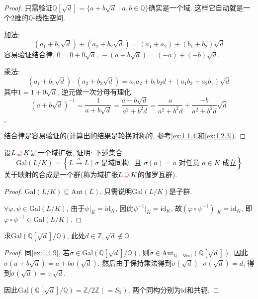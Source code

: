 \begin{proof}
    只需验证$\mathbb{Q}[\sqrt{d}] = \{a + b\sqrt{d} \mid a, b \in \mathbb{Q}\}$确实是一个域. 这样它自动就是一个$2$维的$\mathbb{Q}$-线性空间.
    
    加法:
    \[
        (a_1 + b_1\sqrt{d}) + (a_2 + b_2\sqrt{d}) = (a_1 + a_2) + (b_1 + b_2)\sqrt{d}
    \]
    容易验证结合律, $0 = 0 + 0\sqrt{d},\, -(a + b\sqrt{d}) = (-a) + (-b)\sqrt{d}$.
    
    乘法:
    \[
        (a_1 + b_1\sqrt{d}) \cdot (a_2 + b_2\sqrt{d}) = a_1a_2 + b_1b_2d + (a_1b_2 + a_2b_1)\sqrt{d}
    \]
    其中$1 = 1 + 0\sqrt{d}$, 逆元做一次分母有理化
    \[
        (a + b\sqrt{d})^{-1} = \frac{1}{a + b\sqrt{d}} = \frac{a - b\sqrt{d}}{a^2 + b^2d} = \frac{a}{a^2 + b^2d} + \frac{- b}{a^2 + b^2d}\sqrt{d}
    \],
    
    结合律是容易验证的(计算出的结果是轮换对称的, 参考\ref{ex:1.1.4}和\ref{ex:1.2.3}).
\end{proof}

\begin{problem}
    设$L \,\textcolor{red}{\supseteq}\, K$是一个域扩张, 证明: 下述集合
    \[
        \mathrm{Gal}(L/K) = \left\{L \xrightarrow{\sigma} L \mid \sigma\text{ 是域同构},\text{ 且 } \sigma(a) = a \text{ 对任意 } a \in K \text{ 成立}\right\}
    \]
    关于映射的合成是一个群(称为域扩张$L \,\textcolor{red}{\supseteq}\, K$的伽罗瓦群).
\end{problem}

\begin{proof}
    $\mathrm{Gal}(L/K) \subseteq \mathrm{Aut}(L)$, 只需说明$\mathrm{Gal}(L/K)$是子群.

    $\forall \varphi, \psi \in \mathrm{Gal}(L/K)$, 由于$\psi|_K = \mathrm{id}_K$, 因此$\psi^{-1}|_K = \mathrm{id}_K$, 故$(\varphi \circ \psi^{-1})|_K = \mathrm{id}_K$, 即$\varphi \circ \psi^{-1} \in \mathrm{Gal}(L/K)$.
\end{proof}

\begin{problem}
    求$\mathrm{Gal}\left(\mathbb{Q}[\sqrt{d}]/\mathbb{Q}\right)$, 此处$d \in \mathbb{Z}, \sqrt{d} \notin \mathbb{Q}$.
\end{problem}

\begin{proof}
    同\ref{ex:1.4.9}, 若$\sigma \in \mathrm{Gal}\left(\mathbb{Q}[\sqrt{d}]/\mathbb{Q}\right)$, 则$\sigma \in \mathrm{Aut}_{\mathbb{Q}-\mathsf{Vect}}\left(\mathbb{Q}[\sqrt{d}]\right)$, 因此$\sigma(a + b\sqrt{d}) = a + b\sigma(\sqrt{d})$. 然后由于保持乘法得到$\sigma(\sqrt{d}) \cdot \sigma(\sqrt{d}) = d$, 得到$\sigma(\sqrt{d}) = \pm\sqrt{d}$.

    因此$\mathrm{Gal}\left(\mathbb{Q}[\sqrt{d}]/\mathbb{Q}\right) = \mathbb{Z}/2\mathbb{Z} (= S_2)$, 两个同构分别为$\mathrm{id}$和共轭.
\end{proof}

